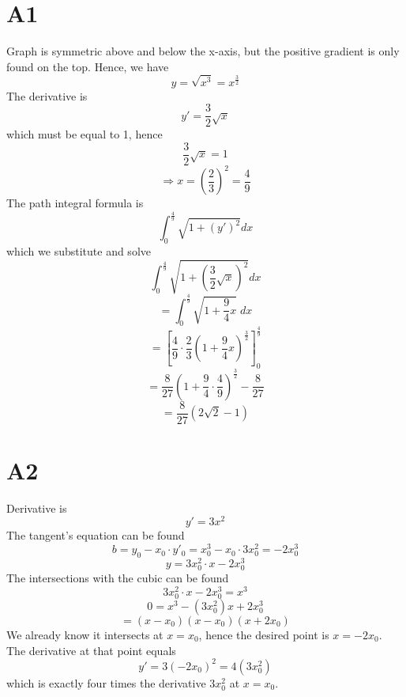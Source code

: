 \documentclass{book}
\begin{document}
\section*{A1}
Graph is symmetric above and below the x-axis, but the positive gradient is only found on the top. Hence, we have
$$y = \sqrt{x^3} = x^\frac{3}{2}$$
The derivative is
$$y' = \frac{3}{2}\sqrt{x}$$
which must be equal to 1, hence
$$\frac{3}{2}\sqrt{x} = 1$$
$$\Rightarrow x = \left( \frac{2}{3} \right)^2 = \frac{4}{9}$$
The path integral formula is
$$\int_0^\frac{4}{9} \sqrt{1 + \left( y' \right)^2}dx$$
which we substitute and solve
$$\int_0^\frac{4}{9} \sqrt{1 + \left( \frac{3}{2}\sqrt{x} \right)^2}dx$$
$$= \int_0^\frac{4}{9} \sqrt{1 + \frac{9}{4}x} \; dx$$
$$= \left[ \frac{4}{9} \cdot \frac{2}{3} \left( 1 + \frac{9}{4}x \right)^\frac{3}{2} \right]_0^\frac{4}{9}$$
$$= \frac{8}{27} \left( 1 + \frac{9}{4} \cdot \frac{4}{9} \right)^\frac{3}{2} - \frac{8}{27}$$
$$= \frac{8}{27} \left( 2\sqrt{2} - 1 \right)$$

\section*{A2}
Derivative is
$$y' = 3x^2$$
The tangent's equation can be found
$$b = y_0 - x_0 \cdot y'_0 = x_0^3 - x_0 \cdot 3x_0^2 = -2x_0^3$$
$$y = 3x_0^2 \cdot x - 2x_0^3$$
The intersections with the cubic can be found
$$3x_0^2 \cdot x - 2x_0^3 = x^3$$
$$0 = x^3 - (3x_0^2) x + 2x_0^3$$
$$= (x - x_0)(x - x_0)(x + 2x_0)$$
We already know it intersects at $x = x_0$, hence the desired point is $x = -2x_0$. The derivative at that point equals
$$y' = 3(-2x_0)^2 = 4 (3x_0^2)$$
which is exactly four times the derivative $3x_0^2$ at $x = x_0$.
\end{document}
